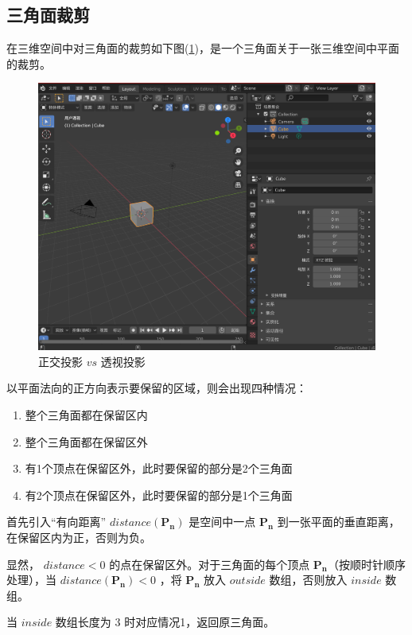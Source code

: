 \documentclass[12pt,oneside,a4paper]{ctexart}
\begin{document}
\subsection{三角面裁剪}
在三维空间中对三角面的裁剪如下图(\ref{Cut})，是一个三角面关于一张三维空间中平面的裁剪。
\begin{figure}[H]
	\centering
	\includegraphics[scale=0.4]{Picture/Annotation 2020-06-23 205119.png}
	\vspace{-2ex}
	\caption{正交投影 $vs$ 透视投影}
	\label{Cut}
\end{figure}

以平面法向的正方向表示要保留的区域，则会出现四种情况：
\begin{enumerate}
	\item 整个三角面都在保留区内
	\item 整个三角面都在保留区外
	\item 有1个顶点在保留区外，此时要保留的部分是2个三角面
	\item 有2个顶点在保留区外，此时要保留的部分是1个三角面
\end{enumerate}

首先引入“有向距离” $distance(\mathbf{P_n})$ 是空间中一点 $\mathbf{P_n}$ 到一张平面的垂直距离，在保留区内为正，否则为负。

显然， $distance<0$ 的点在保留区外。对于三角面的每个顶点 $\mathbf{P_n}$（按顺时针顺序处理），当 $distance(\mathbf{P_n}) < 0$ ，将 $\mathbf{P_n}$ 放入 $outside$ 数组，否则放入 $inside$ 数组。

当 $inside$ 数组长度为 $3$ 时对应情况1，返回原三角面。
\end{document}
